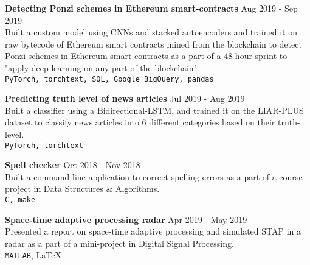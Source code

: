 \documentclass[letterpaper]{article}
\renewenvironment{itemize}{
  \begin{list}{}{
    \setlength{\leftmargin}{1.5em}
  }
}{
  \end{list}
}
\newcommand{\smallGreyFont}[1]{\textcolor{black!80}{\small{#1}}}
\begin{document}
\begin{itemize}
    \item
    \textbf{Detecting Ponzi schemes in Ethereum smart-contracts}
    \hfill{\smallGreyFont{Aug 2019 - Sep 2019}}\\
      Built a custom model using CNNs and stacked autoencoders and trained it on raw bytecode of Ethereum smart contracts mined from the blockchain to detect Ponzi schemes in Ethereum smart-contracts as a part of a 48-hour sprint to "apply deep learning on any part of the blockchain".\\
      \texttt{\smallGreyFont{PyTorch, torchtext, SQL, Google BigQuery, pandas}}

    \item
    \textbf{Predicting truth level of news articles}
    \hfill{\smallGreyFont{Jul 2019 - Aug 2019}}\\
      Built a classifier using a Bidirectional-LSTM, and trained it on the LIAR-PLUS dataset to classify news articles into 6 different categories based on their truth-level.\\
      \texttt{\smallGreyFont{PyTorch, torchtext}}

    \item
    \textbf{Spell checker}
    \hfill{\smallGreyFont{Oct 2018 - Nov 2018}}\\
      Built a command line application to correct spelling errors as a part of a course-project in Data Structures \& Algorithms.\\
      \texttt{\smallGreyFont{C, make}}

    \item
    \textbf{Space-time adaptive processing radar}
    \hfill{\smallGreyFont{Apr 2019 - May 2019}}\\
      Presented a report on space-time adaptive processing and simulated STAP in a radar as a part of a mini-project in Digital Signal Processing.\\
      \smallGreyFont{\texttt{MATLAB}, \LaTeX}
  \end{itemize}

\end{document}
